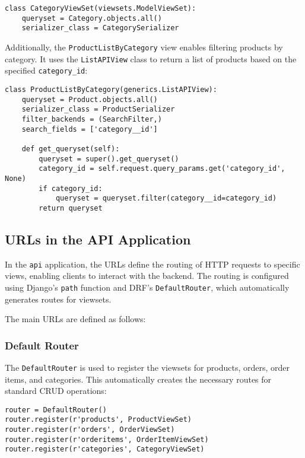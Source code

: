 \begin{verbatim}
class CategoryViewSet(viewsets.ModelViewSet):
    queryset = Category.objects.all()
    serializer_class = CategorySerializer
\end{verbatim}

Additionally, the \texttt{ProductListByCategory} view enables filtering products by category. It uses the \texttt{ListAPIView} class to return a list of products based on the specified \texttt{category\_id}:

\begin{verbatim}
class ProductListByCategory(generics.ListAPIView):
    queryset = Product.objects.all()
    serializer_class = ProductSerializer
    filter_backends = (SearchFilter,)
    search_fields = ['category__id']

    def get_queryset(self):
        queryset = super().get_queryset()
        category_id = self.request.query_params.get('category_id', None)
        if category_id:
            queryset = queryset.filter(category__id=category_id)
        return queryset
\end{verbatim}

\subsection{URLs in the API Application}

In the \texttt{api} application, the URLs define the routing of HTTP requests to specific views, enabling clients to interact with the backend. The routing is configured using Django's \texttt{path} function and DRF's \texttt{DefaultRouter}, which automatically generates routes for viewsets.

The main URLs are defined as follows:

\subsubsection{Default Router}
The \texttt{DefaultRouter} is used to register the viewsets for products, orders, order items, and categories. This automatically creates the necessary routes for standard CRUD operations:

\begin{verbatim}
router = DefaultRouter()
router.register(r'products', ProductViewSet)
router.register(r'orders', OrderViewSet)
router.register(r'orderitems', OrderItemViewSet)
router.register(r'categories', CategoryViewSet)
\end{verbatim}

